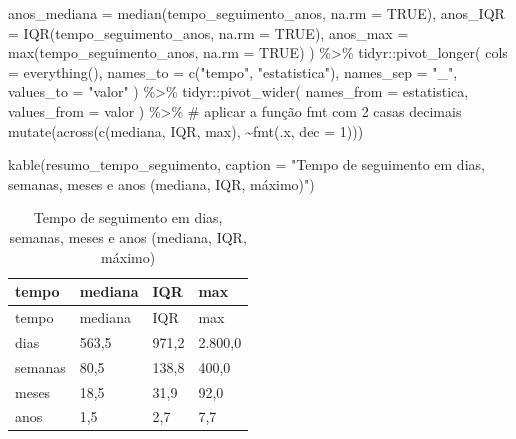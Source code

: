 \documentclass[
]{article}
\newenvironment{Shaded}{\begin{snugshade}}{\end{snugshade}}
\newcommand{\AttributeTok}[1]{\textcolor[rgb]{0.40,0.45,0.13}{#1}}
\newcommand{\CommentTok}[1]{\textcolor[rgb]{0.37,0.37,0.37}{#1}}
\newcommand{\ConstantTok}[1]{\textcolor[rgb]{0.56,0.35,0.01}{#1}}
\newcommand{\DecValTok}[1]{\textcolor[rgb]{0.68,0.00,0.00}{#1}}
\newcommand{\FunctionTok}[1]{\textcolor[rgb]{0.28,0.35,0.67}{#1}}
\newcommand{\NormalTok}[1]{\textcolor[rgb]{0.00,0.23,0.31}{#1}}
\newcommand{\SpecialCharTok}[1]{\textcolor[rgb]{0.37,0.37,0.37}{#1}}
\newcommand{\StringTok}[1]{\textcolor[rgb]{0.13,0.47,0.30}{#1}}
\begin{document}
\begin{Shaded}
\begin{Highlighting}[]
    \AttributeTok{anos\_mediana    =} \FunctionTok{median}\NormalTok{(tempo\_seguimento\_anos, }\AttributeTok{na.rm =} \ConstantTok{TRUE}\NormalTok{),}
    \AttributeTok{anos\_IQR        =} \FunctionTok{IQR}\NormalTok{(tempo\_seguimento\_anos, }\AttributeTok{na.rm =} \ConstantTok{TRUE}\NormalTok{),}
    \AttributeTok{anos\_max        =} \FunctionTok{max}\NormalTok{(tempo\_seguimento\_anos, }\AttributeTok{na.rm =} \ConstantTok{TRUE}\NormalTok{)}
\NormalTok{  ) }\SpecialCharTok{\%\textgreater{}\%}
\NormalTok{  tidyr}\SpecialCharTok{::}\FunctionTok{pivot\_longer}\NormalTok{(}
    \AttributeTok{cols =} \FunctionTok{everything}\NormalTok{(),}
    \AttributeTok{names\_to =} \FunctionTok{c}\NormalTok{(}\StringTok{"tempo"}\NormalTok{, }\StringTok{"estatistica"}\NormalTok{),}
    \AttributeTok{names\_sep =} \StringTok{"\_"}\NormalTok{,}
    \AttributeTok{values\_to =} \StringTok{"valor"}
\NormalTok{  ) }\SpecialCharTok{\%\textgreater{}\%}
\NormalTok{  tidyr}\SpecialCharTok{::}\FunctionTok{pivot\_wider}\NormalTok{(}
    \AttributeTok{names\_from =}\NormalTok{ estatistica,}
    \AttributeTok{values\_from =}\NormalTok{ valor}
\NormalTok{  ) }\SpecialCharTok{\%\textgreater{}\%}
  \CommentTok{\# aplicar a função fmt com 2 casas decimais}
  \FunctionTok{mutate}\NormalTok{(}\FunctionTok{across}\NormalTok{(}\FunctionTok{c}\NormalTok{(mediana, IQR, max), }\SpecialCharTok{\textasciitilde{}}\FunctionTok{fmt}\NormalTok{(.x, }\AttributeTok{dec =} \DecValTok{1}\NormalTok{)))}

\FunctionTok{kable}\NormalTok{(resumo\_tempo\_seguimento,}
      \AttributeTok{caption =} \StringTok{"Tempo de seguimento em dias, semanas, meses e anos (mediana, IQR, máximo)"}\NormalTok{)}
\end{Highlighting}
\end{Shaded}

\begin{longtable}[]{@{}llll@{}}
\caption{Tempo de seguimento em dias, semanas, meses e anos (mediana,
IQR, máximo)}\tabularnewline
\toprule\noalign{}
tempo & mediana & IQR & max \\
\midrule\noalign{}
\endfirsthead
\toprule\noalign{}
tempo & mediana & IQR & max \\
\midrule\noalign{}
\endhead
\bottomrule\noalign{}
\endlastfoot
dias & 563,5 & 971,2 & 2.800,0 \\
semanas & 80,5 & 138,8 & 400,0 \\
meses & 18,5 & 31,9 & 92,0 \\
anos & 1,5 & 2,7 & 7,7 \\
\end{longtable}
\end{document}

